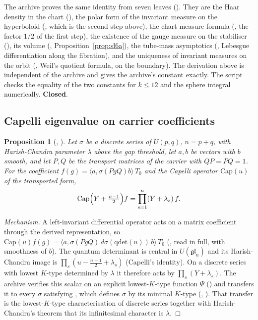 \documentclass[11pt]{article}
\newcommand{\sC}{\textbf{Closed}}
\newtheorem{proposition}[theorem]{Proposition}
\theoremstyle{remark}
\begin{document}
The archive proves the same identity from seven leaves (). They are the Haar density in the chart (), the polar form of the invariant measure on the hyperboloid (, which is the second step above), the chart measure formula (, the factor $1/2$ of the first step), the existence of the gauge measure on the stabiliser (), its volume (, Proposition~\ref{prop:sl6a}), the tube-mass asymptotics (, Lebesgue differentiation along the fibration), and the uniqueness of invariant measures on the orbit (, Weil's quotient formula, on the boundary). The derivation above is independent of the archive and gives the archive's constant exactly. The script checks the equality of the two constants for $k\le12$ and the sphere integral numerically. \sC.

\subsection{Capelli eigenvalue on carrier coefficients}

\begin{proposition}[, ]\label{prop:sl6c}
Let $\sigma$ be a discrete series of $U(p,q)$, $n=p+q$, with Harish-Chandra parameter $\lambda$ above the gap threshold, let $a,b$ be vectors with $b$ smooth, and let $P,Q$ be the transport matrices of the carrier with $QP=PQ=1$. For the coefficient $f(g)=\langle a,\sigma(PgQ)b\rangle\,T_0$ and the Capelli operator $\mathrm{Cap}(u)$ of the transported form,
\[
\mathrm{Cap}\Bigl(Y+\tfrac{n-1}{2}\Bigr)f=\prod_{s=1}^{n}(Y+\lambda_s)\,f.
\]
\end{proposition}

\begin{proof}[Mechanism]
A left-invariant differential operator acts on a matrix coefficient through the derived representation, so $\mathrm{Cap}(u)f(g)=\langle a,\sigma(PgQ)\,d\sigma(\mathrm{qdet}(u))\,b\rangle\,T_0$ (, read in full, with smoothness of $b$). The quantum determinant is central in $U(\mathfrak{gl}_n)$ and its Harish-Chandra image is $\prod_s(u-\tfrac{n-1}{2}+\lambda_s)$ (Capelli's identity). On a discrete series with lowest $K$-type determined by $\lambda$ it therefore acts by $\prod_s(Y+\lambda_s)$. The archive verifies this scalar on an explicit lowest-$K$-type function $\Psi$ () and transfers it to every $\sigma$ satisfying , which defines $\sigma$ by its minimal $K$-type (, ). That transfer is the lowest-$K$-type characterisation of discrete series together with Harish-Chandra's theorem that its infinitesimal character is $\lambda$.
\end{proof}
\end{document}
